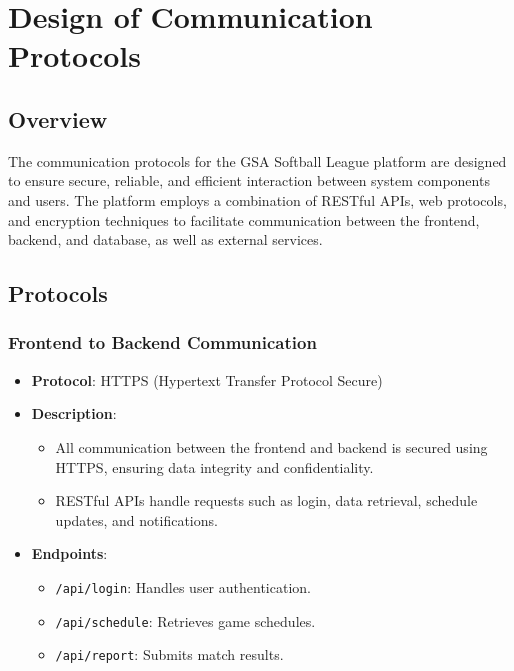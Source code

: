 \documentclass[12pt, titlepage]{article}
\begin{document}
\section{Design of Communication Protocols}

\subsection*{Overview}
The communication protocols for the GSA Softball League platform are designed to ensure secure, reliable, and efficient interaction between system components and users. The platform employs a combination of RESTful APIs, web protocols, and encryption techniques to facilitate communication between the frontend, backend, and database, as well as external services.

\subsection*{Protocols}

\subsubsection*{Frontend to Backend Communication}
\begin{itemize}
  \item \textbf{Protocol}: HTTPS (Hypertext Transfer Protocol Secure)
  \item \textbf{Description}:
        \begin{itemize}
          \item All communication between the frontend and backend is secured using HTTPS, ensuring data integrity and confidentiality.
          \item RESTful APIs handle requests such as login, data retrieval, schedule updates, and notifications.
        \end{itemize}
  \item \textbf{Endpoints}:
        \begin{itemize}
          \item \texttt{/api/login}: Handles user authentication.
          \item \texttt{/api/schedule}: Retrieves game schedules.
          \item \texttt{/api/report}: Submits match results.
        \end{itemize}
\end{itemize}
\end{document}
